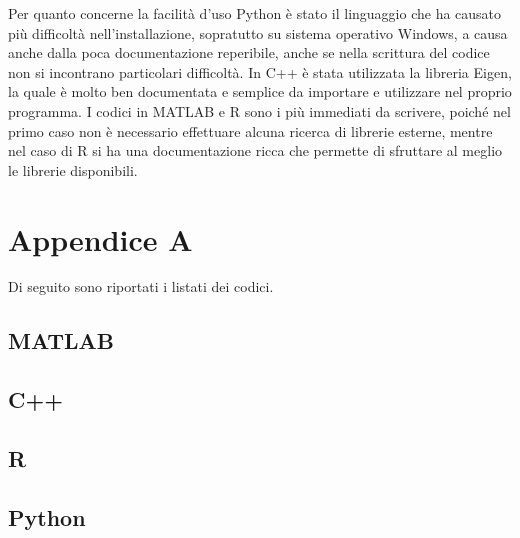 \documentclass[a4paper,12pt]{article}
\begin{document}
\noindent Per quanto concerne la facilità d'uso Python è stato il linguaggio che ha causato più difficoltà nell'installazione, sopratutto su sistema operativo Windows, a causa anche dalla poca documentazione reperibile, anche se nella scrittura del codice non si incontrano particolari difficoltà. In C++ è stata utilizzata la libreria Eigen, la quale è molto ben documentata e semplice da importare e utilizzare nel proprio programma.
I codici in MATLAB e R sono i più immediati da scrivere, poiché nel primo caso non è necessario effettuare alcuna ricerca di librerie esterne, mentre nel caso di R si ha una documentazione ricca che permette di sfruttare al meglio le librerie disponibili.

\newpage
\fancyhf{}
\fancyfoot[C]{\thepage}

\section{Appendice A}
Di seguito sono riportati i listati dei codici.

\subsection{MATLAB}


\newpage
\subsection{C++}




\newpage
\subsection{R}


\newpage
\subsection{Python}

\end{document}
